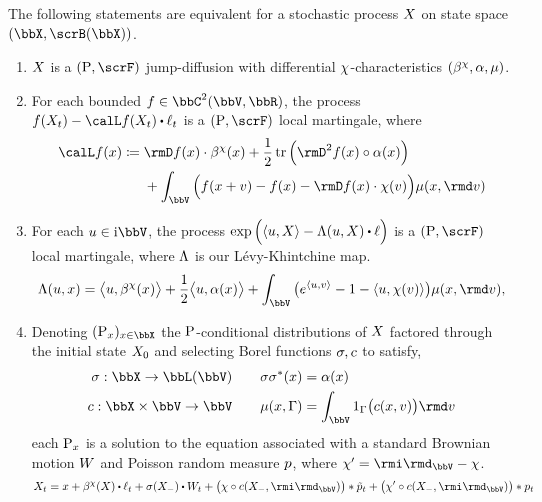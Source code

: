 \begin{theorem}
  \label{theorem:jump-diffusion-characterizations}
  The following statements are equivalent for a stochastic process $X$ on state space $(\stateSpace, \scrB(\stateSpace))$.
  \begin{enumerate}[label=(\alph*)]
    \item
      $X$ is a $(\Prb, \scrF)$ jump-diffusion with differential $\chi$-characteristics $(\beta^\chi, \alpha, \mu)$.
    \item
      For each bounded $f \in \ccpathSpace{2}{\vecSpace}{\bbR}$, the process $f(\X_t) - \generator f(\X_t) \shortInt \leb_t$ is a $(\Prb, \scrF)$ local martingale, where
      \[
        \generator f(\stateVar) \defeq \begin{aligned}[t]
          &\Der f(\stateVar) \cdot \affDrift^\trunc(\stateVar) 
          + \frac12 \tr\Big( \Hess f(\stateVar) \circ \affDiff(\stateVar) \Big) \\
          &+ \int_\vecSpace \Big( f(\stateVar + \markVar) - f(\stateVar) - \Der f(\stateVar) \cdot \trunc(\markVar) \Big) \affJump(\stateVar, \rmd\markVar)
        \end{aligned}
      \]
    \item
      For each $\momentVar \in \im\vecSpace$, the process $\exp\Big(\prj{\momentVar}{\X} - \ode(\momentVar, \X) \shortInt \leb \Big)$ is a $(\Prb, \scrF)$ local martingale, where $\Lambda$ is our L\'evy-Khintchine map.
      \[
        \ode(\momentVar, \stateVar) = \bprj{\momentVar}{\affDrift^\trunc(\stateVar)} + \frac12\bprj{\momentVar}{\affDiff(\stateVar)} + \int_\vecSpace \big( e^\prj{\momentVar}{\markVar} - 1 - \prj{\momentVar}{\trunc(\markVar)} \big) \affJump(\stateVar, \rmd\markVar),
      \]
    \item
      Denoting $(\Prb_\stateVar)_{\stateVar\in\stateSpace}$ the ${\operatorname{P}}$-conditional distributions of $X$ factored through the initial state $X_0$ and selecting Borel functions $\sigma, c$ to satisfy,
      \begin{equation}
        \label{eq:sde-terms}
        \begin{aligned}
          \affDiffSqrt: \stateSpace \rightarrow \bbL(\vecSpace) &&\quad \affDiffSqrt\affDiffSqrt^*(\stateVar) &= \affDiff(\stateVar) \\
          \thinner: \stateSpace \times \vecSpace \rightarrow \vecSpace &&\quad \affJump(\stateVar, \Gamma) &= \int_\vecSpace 1_\Gamma\big( \thinner(\stateVar, \markVar) \big) \rmd\markVar
        \end{aligned}
      \end{equation}
      each ${\operatorname{P}}_x$ is a solution to the equation associated with a standard Brownian motion $W$ and Poisson random measure $p$, where $\trunc' = \id_\vecSpace - \trunc$.
      \begin{equation*}
        \X_t = \stateVar + \affDrift^\trunc(\X) \shortInt \leb_t + \sigma(\X_-) \shortInt \W_t + \big( \trunc \circ \thinner(\X_-, \id_\vecSpace) \big) \ast \compensate{\poisRM}_t + \big( \trunc' \circ \thinner(\X_-, \id_\vecSpace) \big) \ast \poisRM_t
      \end{equation*}
  \end{enumerate}
\end{theorem}
